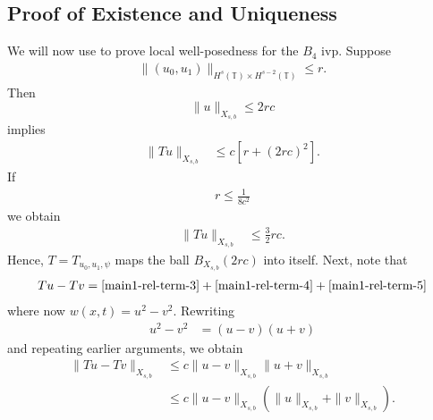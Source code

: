 \documentclass[12pt,reqno]{amsart}
\numberwithin{equation}{section}  %
\renewcommand{\cref}{\Cref}
\newcommand{\ci}{\mathbb{T}}
\begin{document}
\subsection{Proof of Existence and Uniqueness}
\label{sec:proof-b4-per-case}
%
%
%
%				 
%
We will now use \cref{prop:contraction} to prove local well-posedness for the 
$B_4$ ivp. Suppose
%
\begin{equation*}
	\begin{split}
    \|(u_0, u_{1})\|_{H^s(\ci) \times H^{s-2}(\ci)} \le r.
  \end{split}
\end{equation*}
%
Then $$\|u\|_{X_{s,b}} \le 2rc$$ implies
%
\begin{equation*}
	\begin{split}
		\|Tu \|_{X_{s,b}} 
    & \le c \left[ r + \left( 
		2rc \right)^2 \right].
	\end{split}
\end{equation*}
%
If 
%
%
\begin{equation}
  \label{delta-suf-small}
\begin{split}
  r \le  \frac{1}{8c^{2}} 
\end{split}
\end{equation}
%
%
we obtain 
%
%
%
\begin{equation*}
\begin{split}
\|Tu \|_{X_{s,b}} 
    & \le \frac{3}{2}rc.
  \end{split}
\end{equation*}
%
%
Hence, $T=T_{u_0, u_1, \psi}$ maps the ball $B_{X_{s,b}}(2rc)$ into
itself. Next, note that 
%
\begin{equation*}
	\begin{split}
    Tu - Tv = \cref{main1-rel-term-3} + \cref{main1-rel-term-4} +
    \cref{main1-rel-term-5} 
  \end{split}
  \label{eqn:integral-form-dif}
\end{equation*}
%
where now $w(x,t) =u^{2} - v^{2}$. Rewriting
%
\begin{equation*}
	\begin{split}
	u^2 - v^2
		& = (u-v)(u+v)
		\end{split}
\end{equation*}
%
and repeating earlier arguments, we obtain
%
\begin{equation}
	\label{20a}
	\begin{split}
		\|Tu - Tv \|_{X_{s,b}}  
    & \le c \|u -v\|_{X_{s,b}} \|u + v \|_{X_{s,b}}
		\\
    & \le c \|u -v\|_{X_{s,b}} (\|u\|_{X_{s,b}}+ \|v \|_{X_{s,b}}).
	\end{split}
\end{equation}
\end{document}
